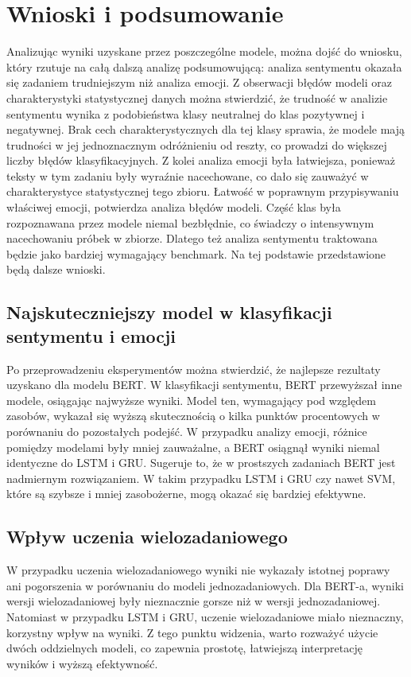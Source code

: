 \chapter{Wnioski i podsumowanie}
Analizując wyniki uzyskane przez poszczególne modele, można dojść do wniosku, który rzutuje na całą dalszą analizę podsumowującą: analiza sentymentu okazała się zadaniem trudniejszym niż analiza emocji. Z obserwacji błędów modeli oraz charakterystyki statystycznej danych można stwierdzić, że trudność w analizie sentymentu wynika z podobieństwa klasy neutralnej do klas pozytywnej i negatywnej. Brak cech charakterystycznych dla tej klasy sprawia, że modele mają trudności w jej jednoznacznym odróżnieniu od reszty, co prowadzi do większej liczby błędów klasyfikacyjnych. Z kolei analiza emocji była łatwiejsza, ponieważ teksty w tym zadaniu były wyraźnie nacechowane, co dało się zauważyć w charakterystyce statystycznej tego zbioru. Łatwość w poprawnym przypisywaniu właściwej emocji, potwierdza analiza błędów modeli. Część klas była rozpoznawana przez modele niemal bezbłędnie, co świadczy o intensywnym nacechowaniu próbek w zbiorze. Dlatego też analiza sentymentu traktowana będzie jako bardziej wymagający benchmark. Na tej podstawie przedstawione będą dalsze wnioski.

\section{Najskuteczniejszy model w klasyfikacji sentymentu i emocji}
Po przeprowadzeniu eksperymentów można stwierdzić, że najlepsze rezultaty uzyskano dla modelu BERT. W klasyfikacji sentymentu, BERT przewyższał inne modele, osiągając najwyższe wyniki. Model ten, wymagający pod względem zasobów, wykazał się wyższą skutecznością o kilka punktów procentowych w porównaniu do pozostałych podejść. W przypadku analizy emocji, różnice pomiędzy modelami były mniej zauważalne, a BERT osiągnął wyniki niemal identyczne do LSTM i GRU. Sugeruje to, że w prostszych zadaniach BERT jest nadmiernym rozwiązaniem. W takim przypadku LSTM i GRU czy nawet SVM, które są szybsze i mniej zasobożerne, mogą okazać się bardziej efektywne.

\section{Wpływ uczenia wielozadaniowego}
W przypadku uczenia wielozadaniowego wyniki nie wykazały istotnej poprawy ani pogorszenia w porównaniu do modeli jednozadaniowych. Dla BERT-a, wyniki wersji wielozadaniowej były nieznacznie gorsze niż w wersji jednozadaniowej. Natomiast w przypadku LSTM i GRU, uczenie wielozadaniowe miało nieznaczny, korzystny wpływ na wyniki. Z tego punktu widzenia, warto rozważyć użycie dwóch oddzielnych modeli, co zapewnia prostotę, łatwiejszą interpretację wyników i wyższą efektywność.

